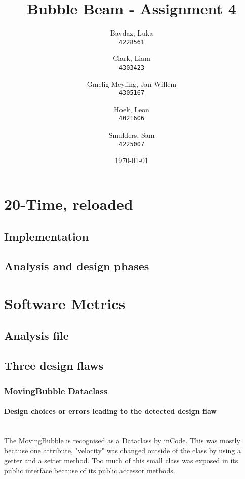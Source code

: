 \documentclass[a4paper]{article}
\title{Bubble Beam - Assignment 4}
\author{
    Bavdaz, Luka\\
    \texttt{4228561}
    \and
    Clark, Liam\\
    \texttt{4303423}
    \and
    Gmelig Meyling, Jan-Willem\\
    \texttt{4305167}
    \and
    Hoek, Leon\\
    \texttt{4021606}
    \and
    Smulders, Sam\\
    \texttt{4225007}
}
\date{\today}
\begin{document}
\maketitle

\section{20-Time, reloaded}

\subsection{Implementation}

\subsection{Analysis and design phases}

\section{Software Metrics}

\subsection{Analysis file}


\subsection{Three design flaws}


\subsubsection{MovingBubble Dataclass}\label{MovingBubble}
\paragraph{Design choices or errors leading to the detected design flaw}\mbox{}\\
The MovingBubble is recognised as a Dataclass by inCode. This was mostly because one attribute, "velocity" was changed outside of the class by using a getter and a setter method. Too much of this small class was exposed in its public interface because of its public accessor methods.
\end{document}
